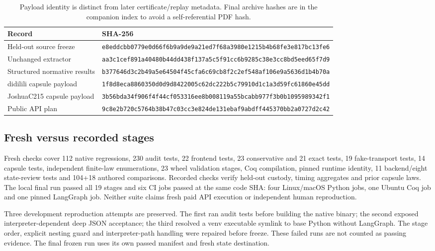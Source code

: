 \documentclass[11pt,a4paper]{article}
\newcommand{\cp}[1]{\nolinkurl{#1}}
\begin{document}
\begin{table}[h]
\small
\begin{tabularx}{\textwidth}{@{}>{\raggedright\arraybackslash}p{3.3cm} >{\raggedright\arraybackslash}X@{}}
\toprule
Record & SHA-256 \\
\midrule
Held-out source freeze & \cp{e8eddcbb0779e0d66f6b9a9de9a21ed7f68a3980e1215b4b68fe3e817bc13fe6} \\
Unchanged extractor & \cp{aa3c1cef891a40480b44dd438f137a5c5f91cc6b9285c38e3cc8bd5eed65f7d9} \\
Structured normative results & \cp{b377646d3c2b49a5e64504f45cfa6c69cb8f2c2ef548af106e9a5636d1b4b70a} \\
didilili capsule payload & \cp{1f8d8eca8860350d0d9d8422005c62dc222b5c79910d1c1a3d59fc61860e45dd} \\
JoshuaC215 capsule payload & \cp{3b56bda34f906f4f44cf053316ee8b008119a55bcabb977f3b0b1095989342f1} \\
Public API plan & \cp{9c8e2b720c5764b38b47c03cc3e824de131ebaf9abdff445370bb2a0727d2c42} \\
\bottomrule
\end{tabularx}
\caption{Payload identity is distinct from later certificate/replay metadata. Final archive hashes are in the companion index to avoid a self-referential PDF hash.}
\end{table}

\subsection{Fresh versus recorded stages}
Fresh checks cover 112 native regressions, 230 audit tests, 22 frontend tests, 23 conservative and 21 exact tests, 19 fake-transport tests, 14 capsule tests, independent finite-law enumerations, 23 wheel validation stages, Coq compilation, pinned runtime identity, 11 backend/eight state-review tests and 104+18 authored comparisons. Recorded checks verify held-out custody, timing aggregates and prior capsule laws. The local final run passed all 19 stages and six CI jobs passed at the same code SHA: four Linux/macOS Python jobs, one Ubuntu Coq job and one pinned LangGraph job. Neither suite claims fresh paid API execution or independent human reproduction.

Three development reproduction attempts are preserved. The first ran audit tests before building the native binary; the second exposed interpreter-dependent deep JSON acceptance; the third resolved a venv executable symlink to base Python without LangGraph. The stage order, explicit nesting guard and interpreter-path handling were repaired before freeze. These failed runs are not counted as passing evidence. The final frozen run uses its own passed manifest and fresh state destination.
\end{document}
